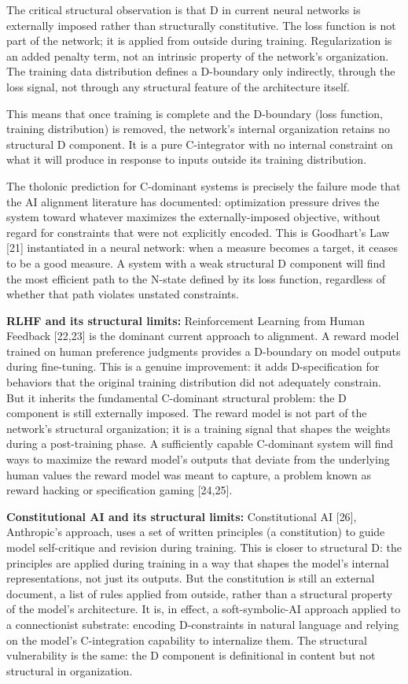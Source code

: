 \documentclass[
  11pt,
  letterpaper,
]{article}
\begin{document}
The critical structural observation is that D in current neural networks
is externally imposed rather than structurally constitutive. The loss
function is not part of the network; it is applied from outside during
training. Regularization is an added penalty term, not an intrinsic
property of the network's organization. The training data distribution
defines a D-boundary only indirectly, through the loss signal, not
through any structural feature of the architecture itself.

This means that once training is complete and the D-boundary (loss
function, training distribution) is removed, the network's internal
organization retains no structural D component. It is a pure
C-integrator with no internal constraint on what it will produce in
response to inputs outside its training distribution.

The tholonic prediction for C-dominant systems is precisely the failure
mode that the AI alignment literature has documented: optimization
pressure drives the system toward whatever maximizes the
externally-imposed objective, without regard for constraints that were
not explicitly encoded. This is Goodhart's Law {[}21{]} instantiated in
a neural network: when a measure becomes a target, it ceases to be a
good measure. A system with a weak structural D component will find the
most efficient path to the N-state defined by its loss function,
regardless of whether that path violates unstated constraints.

\textbf{RLHF and its structural limits:} Reinforcement Learning from
Human Feedback {[}22,23{]} is the dominant current approach to
alignment. A reward model trained on human preference judgments provides
a D-boundary on model outputs during fine-tuning. This is a genuine
improvement: it adds D-specification for behaviors that the original
training distribution did not adequately constrain. But it inherits the
fundamental C-dominant structural problem: the D component is still
externally imposed. The reward model is not part of the network's
structural organization; it is a training signal that shapes the weights
during a post-training phase. A sufficiently capable C-dominant system
will find ways to maximize the reward model's outputs that deviate from
the underlying human values the reward model was meant to capture, a
problem known as reward hacking or specification gaming {[}24,25{]}.

\textbf{Constitutional AI and its structural limits:} Constitutional AI
{[}26{]}, Anthropic's approach, uses a set of written principles (a
constitution) to guide model self-critique and revision during training.
This is closer to structural D: the principles are applied during
training in a way that shapes the model's internal representations, not
just its outputs. But the constitution is still an external document, a
list of rules applied from outside, rather than a structural property of
the model's architecture. It is, in effect, a soft-symbolic-AI approach
applied to a connectionist substrate: encoding D-constraints in natural
language and relying on the model's C-integration capability to
internalize them. The structural vulnerability is the same: the D
component is definitional in content but not structural in organization.
\end{document}
